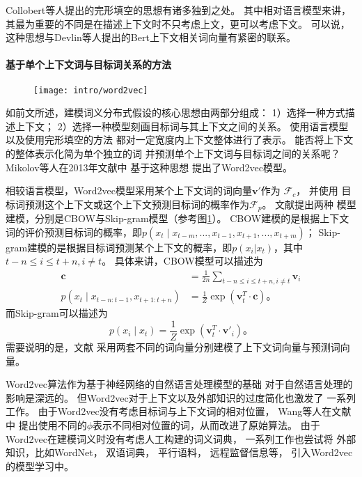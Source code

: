 Collobert等人提出的完形填空的思想有诸多独到之处。
其中相对语言模型来讲，
其最为重要的不同是在描述上下文时不只考虑上文，更可以考虑下文。
可以说，这种思想与Devlin等人提出的Bert上下文相关词向量有紧密的联系。

\paragraph{基于单个上下文词与目标词关系的方法}
\begin{figure}[t]
	\centering
	\texttt{[image: intro/word2vec]}
	\label{fig:intro:word2vec}
\end{figure}

如前文所述，建模词义分布式假设的核心思想由两部分组成：
1）选择一种方式描述上下文；
2）选择一种模型刻画目标词与其上下文之间的关系。
使用语言模型以及使用完形填空的方法
都对一定宽度内上下文整体进行了表示。
能否将上下文的整体表示化简为单个独立的词
并预测单个上下文词与目标词之间的关系呢？
Mikolov等人在2013年文献中
基于这种思想
提出了Word2vec模型。


相较语言模型，Word2vec模型采用某个上下文词的词向量$\mathbf{v}'$作为
$\mathcal{F}_c$，
并使用
目标词预测这个上下文或这个上下文预测目标词的概率作为$\mathcal{F}_p$。
文献提出两种
模型建模，分别是CBOW与Skip-gram模型（参考图\ref{fig:intro:word2vec}）。
CBOW建模的是根据上下文词的评价预测目标词的概率，即$p(x_{t} \mid x_{t-m}, ..., x_{t-1}, x_{t+1}, ..., x_{t+m})$；
Skip-gram建模的是根据目标词预测某个上下文的概率，即$p(x_i | x_t)$，其中$t-n\le i\le t+n, i \ne t$。
具体来讲，CBOW模型可以描述为
\begin{align*}
\mathbf{c} &= \frac{1}{2n}\sum_{t-n\le i\le t+n, i \ne t } \mathbf{v}_i \\
p(x_{t} \mid x_{t-n: t-1}, x_{t+1: t+n}) & = \frac{1}{Z} \exp (\mathbf{v}_t^{T} \cdot \mathbf{c})\text{。}
\end{align*}
而Skip-gram可以描述为
\[
p(x_i \mid x_t) = \frac{1}{Z} \exp (\mathbf{v}_t^T \cdot \mathbf{v}'_i)\text{。}
\]
需要说明的是，文献
采用两套不同的词向量分别建模了上下文词向量与预测词向量。

Word2vec算法作为基于神经网络的自然语言处理模型的基础
对于自然语言处理的影响是深远的。
但Word2vec对于上下文以及外部知识的过度简化也激发了
一系列工作。
由于Word2vec没有考虑目标词与上下文词的相对位置，
Wang等人在文献中
提出使用不同的$\phi$表示不同相对位置的词，从而改进了原始算法。
由于Word2vec在建模词义时没有考虑人工构建的词义词典，
一系列工作也尝试将
外部知识，比如WordNet\cite{rothe-schutze:2015:ACL-IJCNLP}，
双语词典\cite{DBLP:journals/corr/SmithTHH17}，
平行语料\cite{AAAI1612236}，
远程监督信息\cite{tang-EtAl:2014:P14-1}等，
引入Word2vec的模型学习中。


